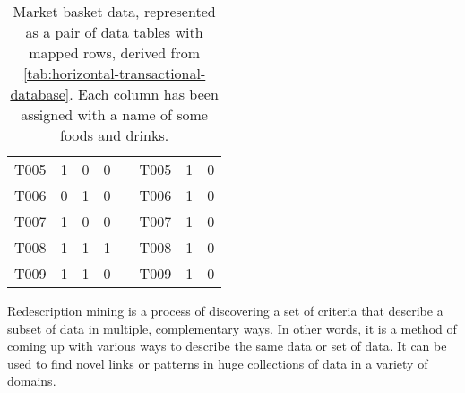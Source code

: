 \begin{table}[tb]
{\begin{tabular}{|llll|l|lll|}
            \multicolumn{1}{|l|}{T005}           & \multicolumn{1}{l|}{\cellcolor[HTML]{9AFF99}1} & \multicolumn{1}{l|}{\cellcolor[HTML]{FFCCC9}0} & \cellcolor[HTML]{FFCCC9}0 &  & \multicolumn{1}{l|}{T005}           & \multicolumn{1}{l|}{\cellcolor[HTML]{9AFF99}1} & \cellcolor[HTML]{FFCCC9}0 \\ \cline{1-4} \cline{6-8} 
            \multicolumn{1}{|l|}{T006}           & \multicolumn{1}{l|}{\cellcolor[HTML]{FFCCC9}0} & \multicolumn{1}{l|}{\cellcolor[HTML]{9AFF99}1} & \cellcolor[HTML]{FFCCC9}0 &  & \multicolumn{1}{l|}{T006}           & \multicolumn{1}{l|}{\cellcolor[HTML]{9AFF99}1} & \cellcolor[HTML]{FFCCC9}0 \\ \cline{1-4} \cline{6-8} 
            \multicolumn{1}{|l|}{T007}           & \multicolumn{1}{l|}{\cellcolor[HTML]{9AFF99}1} & \multicolumn{1}{l|}{\cellcolor[HTML]{FFCCC9}0} & \cellcolor[HTML]{FFCCC9}0 &  & \multicolumn{1}{l|}{T007}           & \multicolumn{1}{l|}{\cellcolor[HTML]{9AFF99}1} & \cellcolor[HTML]{FFCCC9}0 \\ \cline{1-4} \cline{6-8} 
            \multicolumn{1}{|l|}{T008}           & \multicolumn{1}{l|}{\cellcolor[HTML]{9AFF99}1} & \multicolumn{1}{l|}{\cellcolor[HTML]{9AFF99}1} & \cellcolor[HTML]{9AFF99}1 &  & \multicolumn{1}{l|}{T008}           & \multicolumn{1}{l|}{\cellcolor[HTML]{9AFF99}1} & \cellcolor[HTML]{FFCCC9}0 \\ \cline{1-4} \cline{6-8} 
            \multicolumn{1}{|l|}{T009}           & \multicolumn{1}{l|}{\cellcolor[HTML]{9AFF99}1} & \multicolumn{1}{l|}{\cellcolor[HTML]{9AFF99}1} & \cellcolor[HTML]{FFCCC9}0 &  & \multicolumn{1}{l|}{T009}           & \multicolumn{1}{l|}{\cellcolor[HTML]{9AFF99}1} & \cellcolor[HTML]{FFCCC9}0 \\ \cline{1-4} \cline{6-8} 
        \end{tabular}%
    }
    \caption{Market basket data, represented as a pair of data tables with mapped rows, derived from \autoref{tab:horizontal-transactional-database}. Each column has been assigned with a name of some foods and drinks.}
    \label{tab:market-basket-redescription}
\end{table}

Redescription mining is a process of discovering a set of criteria that describe a subset of data in multiple, complementary ways.
In other words, it is a method of coming up with various ways to describe the same data or set of data.
It can be used to find novel links or patterns in huge collections of data in a variety of domains.

